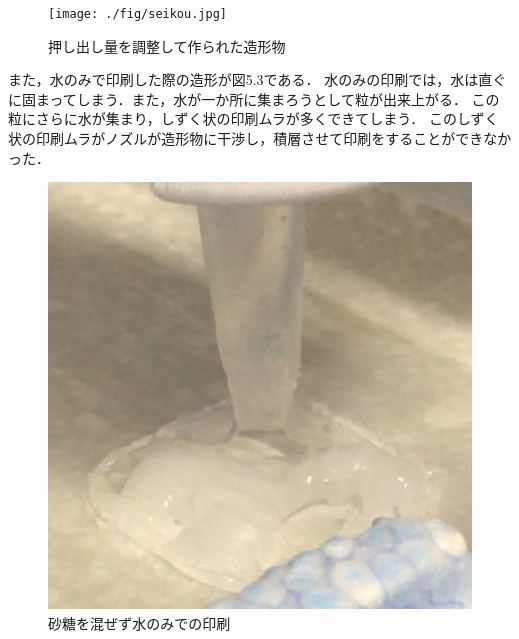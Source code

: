   \begin{figure}[H]
    \centering
    \texttt{[image: ./fig/seikou.jpg]}
    \caption{押し出し量を調整して作られた造形物}
    \label{fig:printer2}
  \end{figure}

また，水のみで印刷した際の造形が図5.3である．
水のみの印刷では，水は直ぐに固まってしまう．また，水が一か所に集まろうとして粒が出来上がる．
この粒にさらに水が集まり，しずく状の印刷ムラが多くできてしまう．
このしずく状の印刷ムラがノズルが造形物に干渉し，積層させて印刷をすることができなかった．

\begin{figure}[H]
    \centering
    \includegraphics[width=8truecm]{./fig/mizu.png}
    \caption{砂糖を混ぜず水のみでの印刷}
    \label{fig:printer2}
  \end{figure}




